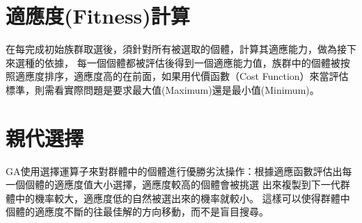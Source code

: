 \section{適應度(Fitness)計算}

在每完成初始族群取選後，須針對所有被選取的個體，計算其適應能力，做為接下來選種的依據， 每一個個體都被評估後得到一個適應能力值，族群中的個體被按照適應度排序，適應度高的在前面，如果用代價函數（Cost Function）來當評估標準，則需看實際問題是要求最大值(Maximum)還是最小值(Minimum)。
\section{親代選擇}
GA使用選擇運算子來對群體中的個體進行優勝劣汰操作：根據適應函數評估出每一個個體的適應度值大小選擇，適應度較高的個體會被挑選 出來複製到下一代群體中的機率較大，適應度低的自然被選出來的機率就較小。 這樣可以使得群體中個體的適應度不斷的往最佳解的方向移動，而不是盲目搜尋。

